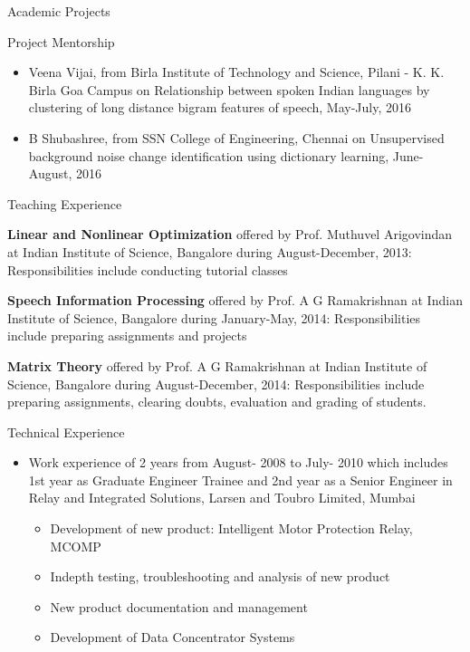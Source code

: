 \documentclass[10pt]{article}
\begin{document}
\begin{cv}
\begin{cvlist}{Academic Projects}
\begin{itemize}
\end{itemize}
\end{cvlist}



\begin{cvlist}{Project Mentorship}
\item
\begin{itemize}


\item Veena Vijai, from Birla Institute of Technology and Science, Pilani - K. K. Birla Goa Campus  on Relationship between spoken Indian languages by clustering of long distance bigram features of speech, May-July, 2016

\item B Shubashree, from SSN College of Engineering, Chennai on Unsupervised background noise change identification using dictionary learning, June- August, 2016
\end{itemize}

\end{cvlist}

\begin{cvlist}{Teaching Experience}

\item 
 \textbf{Linear and Nonlinear Optimization} offered  by Prof. Muthuvel Arigovindan at  Indian Institute of Science, Bangalore during 
 August-December, 2013: Responsibilities include conducting tutorial classes  
\item
 \textbf{Speech Information Processing}  offered  by Prof. A G Ramakrishnan at  Indian Institute of Science, Bangalore during 
  January-May, 2014: Responsibilities include   preparing assignments and projects
  \item
   \textbf{Matrix Theory}  offered  by Prof. A G Ramakrishnan at  Indian Institute of Science, Bangalore during 
    August-December, 2014: Responsibilities include   preparing assignments, clearing doubts, evaluation and grading of students.
      

\end{cvlist}
\begin{cvlist}{Technical Experience}
\item
\begin{itemize}\itemsep=0.25em
	\item Work experience of 2 years from August- 2008 to July- 2010 which includes 1st year as
Graduate Engineer Trainee and 2nd year as a Senior Engineer in Relay and Integrated
Solutions, Larsen and Toubro Limited, Mumbai
\begin{itemize}
 \item
Development of new product: Intelligent Motor Protection Relay, MCOMP
\item
Indepth testing, troubleshooting and analysis of new product
\item
New product documentation and management
\item
Development of Data Concentrator Systems


\end{itemize}
\end{itemize}
\end{cvlist}
\end{cv}
\end{document}
